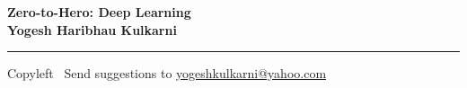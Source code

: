 
\graphicspath{{images/}}


\footnotesize


\begin{center}
\Large{\textbf{Zero-to-Hero: Deep Learning\\ Yogesh Haribhau Kulkarni}}  
\end{center}

\begin{multicols}{2}

\end{multicols}

\rule{\linewidth}{0.25pt}
\scriptsize
Copyleft \textcopyleft\  Send suggestions to 
\href{http://www.yogeshkulkarni.com}{yogeshkulkarni@yahoo.com}


